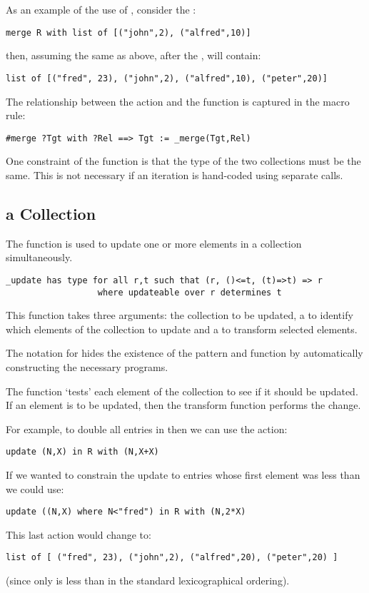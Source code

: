 As an example of the use of , consider the :
\begin{lstlisting}
merge R with list of [("john",2), ("alfred",10)]
\end{lstlisting}
then, assuming the same  as above, after the ,  will contain:
\begin{lstlisting}
list of [("fred", 23), ("john",2), ("alfred",10), ("peter",20)]
\end{lstlisting}

The relationship between the  action and the  function is captured in the macro rule:
\begin{lstlisting}
#merge ?Tgt with ?Rel ==> Tgt := _merge(Tgt,Rel)
\end{lstlisting}

\begin{aside}
One constraint of the  function is that the type of the two collections must be the same. This is not necessary if an iteration is hand-coded using separate  calls.
\end{aside}

\subsection{ a Collection}
\label{update}
The  function is used to update one or more elements in a collection simultaneously.
\begin{lstlisting}
_update has type for all r,t such that (r, ()<=t, (t)=>t) => r
                  where updateable over r determines t
\end{lstlisting}
This function takes three arguments: the collection to be updated, a  to identify which elements of the collection to update and a  to transform selected elements.

\begin{aside}
The  notation for  hides the existence of the pattern and function by automatically constructing the necessary programs.
\end{aside}

The  function `tests' each element of the collection to see if it should be updated. If an element is to be updated, then the transform function performs the change.

For example, to double all entries in  then we can use the action:
\begin{lstlisting}
update (N,X) in R with (N,X+X)
\end{lstlisting}
If we wanted to constrain the update to entries whose first element was less than  we could use:
\begin{lstlisting}
update ((N,X) where N<"fred") in R with (N,2*X)
\end{lstlisting}
This last action would change  to:
\begin{lstlisting}
list of [ ("fred", 23), ("john",2), ("alfred",20), ("peter",20) ]
\end{lstlisting}
(since only  is less than  in the standard lexicographical ordering).

